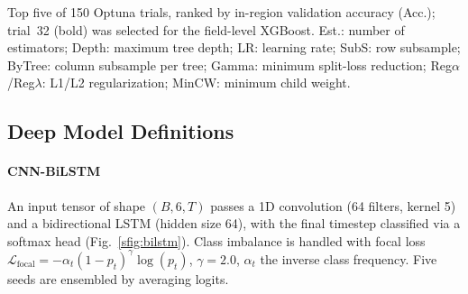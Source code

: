 \documentclass[preprint,authoryear,3p]{elsarticle}
\begin{document}
\begin{table}[!t]
\centering
\scriptsize
\caption{XGBoost hyperparameter search: top 5 Optuna trials with validation accuracy.}
\label{stab:trials}
\renewcommand{\arraystretch}{1.1}
\setlength{\tabcolsep}{6pt}
\par\vspace{3pt}
\begin{minipage}{\linewidth}
\footnotesize
Top five of 150 Optuna trials, ranked by in-region validation accuracy (Acc.); trial~32 (bold) was
selected for the field-level XGBoost. Est.: number of estimators; Depth: maximum tree depth; LR:
learning rate; SubS: row subsample; ByTree: column subsample per tree; Gamma: minimum split-loss
reduction; Reg$\alpha$/Reg$\lambda$: L1/L2 regularization; MinCW: minimum child weight.
\end{minipage}
\end{table}

\subsection{Deep Model Definitions}
\paragraph{CNN-BiLSTM} An input tensor of shape $(B,6,T)$ passes a 1D convolution (64 filters,
kernel 5) and a bidirectional LSTM (hidden size 64), with the final timestep classified via a
softmax head (Fig.~\ref{sfig:bilstm}). Class imbalance is handled with focal loss
$\mathcal{L}_{\text{focal}} = -\alpha_t (1-p_t)^{\gamma}\log(p_t)$, $\gamma=2.0$, $\alpha_t$ the
inverse class frequency. Five seeds are ensembled by averaging logits.
\end{document}
